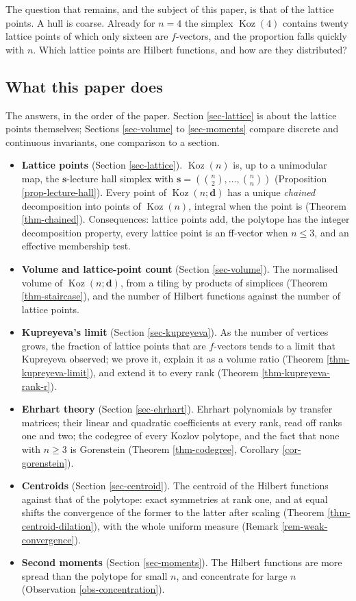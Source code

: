 \documentclass[11pt, a4paper, abstract=yes]{scrartcl}
\theoremstyle{definition}
\theoremstyle{remark}
\theoremstyle{plain}
\newcommand{\vek}[1]{\boldsymbol{#1}}
\theoremstyle{remark}
\theoremstyle{plain}
\newcommand{\Koz}{\operatorname{Koz}}
\begin{document}
The question that remains, and the subject of this paper, is that of the lattice points.
A hull is coarse. Already for \(n=4\) the simplex \(\Koz(4)\) contains twenty lattice points of
which only sixteen are \(f\)-vectors, and the proportion falls quickly with \(n\). Which lattice
points are Hilbert functions, and how are they distributed?
\subsection{What this paper does}
\label{sec:orgb441878}

The answers, in the order of the paper. Section \ref{sec-lattice} is about the lattice points
themselves; Sections \ref{sec-volume} to \ref{sec-moments} compare discrete and continuous invariants,
one comparison to a section.

\begin{itemize}
\item \textbf{Lattice points} (Section \ref{sec-lattice}). \(\Koz(n)\) is, up to a unimodular map, the
\(\vek s\)-lecture hall simplex with \(\vek s=(\binom n2,\dots,\binom nn)\)
(Proposition \ref{prop-lecture-hall}). Every point of \(\Koz(n;\vek d)\) has a unique \emph{chained}
decomposition into points of \(\Koz(n)\), integral when the point is (Theorem \ref{thm-chained}).
Consequences: lattice points add, the polytope has the integer decomposition property, every
lattice point is an ff-vector when \(n\le3\), and an effective membership test.
\item \textbf{Volume and lattice-point count} (Section \ref{sec-volume}). The normalised volume of
\(\Koz(n;\vek d)\), from a tiling by products of simplices (Theorem \ref{thm-staircase}), and the
number of Hilbert functions against the number of lattice points.
\item \textbf{Kupreyeva's limit} (Section \ref{sec-kupreyeva}). As the number of vertices grows, the fraction of
lattice points that are \(f\)-vectors tends to a limit that Kupreyeva observed; we prove it,
explain it as a volume ratio (Theorem \ref{thm-kupreyeva-limit}), and extend it to every rank
(Theorem \ref{thm-kupreyeva-rank-r}).
\item \textbf{Ehrhart theory} (Section \ref{sec-ehrhart}). Ehrhart polynomials by transfer matrices; their
linear and quadratic coefficients at every rank, read off ranks one and two; the codegree of
every Kozlov polytope, and the fact that none with \(n\ge3\) is Gorenstein
(Theorem \ref{thm-codegree}, Corollary \ref{cor-gorenstein}).
\item \textbf{Centroids} (Section \ref{sec-centroid}). The centroid of the Hilbert functions against that of
the polytope: exact symmetries at rank one, and at equal shifts the convergence of the former to
the latter after scaling (Theorem \ref{thm-centroid-dilation}), with the whole uniform measure
(Remark \ref{rem-weak-convergence}).
\item \textbf{Second moments} (Section \ref{sec-moments}). The Hilbert functions are more spread than the
polytope for small \(n\), and concentrate for large \(n\) (Observation \ref{obs-concentration}).
\end{itemize}
\end{document}
